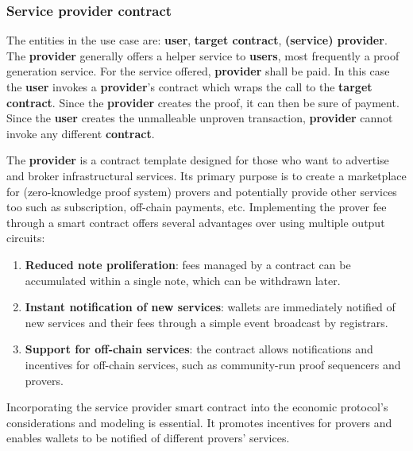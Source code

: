 \documentclass[twocolumn, nofootinbib]{revtex4-2} %
\newcommand{\emphasize}[1]{\textbf{#1}\xspace}
\newcommand{\contract}{\emphasize{contract}}
\newcommand{\provider}{\emphasize{provider}}
\newcommand{\user}{\emphasize{user}}
\newcommand{\users}{\emphasize{users}}
\begin{document}
    \subsubsection{Service provider contract}\label{sec:specifications:scenario-3:service-provider-contract}
    The entities in the use case are: \user, \textbf{target contract},
    \textbf{(service) provider}.
    The \provider generally offers a helper service to \users,
    most frequently a proof generation service.
    For the service offered, \provider shall be paid.
    In this case the \user invokes a \provider's contract which
    wraps the call to the \textbf{target contract}.
    Since the \provider creates the proof, it can then be sure of
    payment.
    Since the \user creates the unmalleable unproven transaction,
    \provider cannot invoke any different \contract.

    The \provider is a contract template designed for those who want to
    advertise and broker infrastructural services.
    Its primary purpose is to create a marketplace for (zero-knowledge proof system)
    provers and potentially
    provide other services too such as subscription, off-chain payments, etc.
    Implementing the prover fee through a smart contract offers several
    advantages over using multiple output circuits:

    \begin{enumerate}
        \item \textbf{Reduced note proliferation}: fees managed by a contract
              can be accumulated within a single note, which can be withdrawn
              later.
        \item \textbf{Instant notification of new services}: wallets are
              immediately notified of new services and their fees through a
              simple event broadcast by registrars.
        \item \textbf{Support for off-chain services}: the contract allows
              notifications and incentives for off-chain services, such as
              community-run proof sequencers and provers.
    \end{enumerate}

    Incorporating the service provider smart contract into the economic
    protocol's considerations and modeling is essential.
    It promotes incentives for provers and enables wallets to be notified of
    different provers' services.
\end{document}
